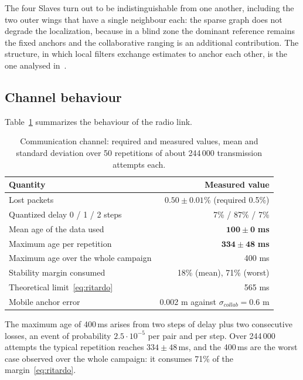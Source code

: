\documentclass[conference,9pt]{IEEEtran}
\begin{document}
The four Slaves turn out to be indistinguishable from one another, including
the two outer wings that have a single neighbour each: the sparse graph does
not degrade the localization, because in a blind zone the dominant reference
remains the fixed anchors and the collaborative ranging is an additional
contribution. The structure, in which local filters exchange estimates to
anchor each other, is the one analysed in~\cite{fontanelli2016}.

\subsection{Channel behaviour}

Table~\ref{tab:canale} summarizes the behaviour of the radio link.

\begin{table}[t]
\centering
\caption{Communication channel: required and measured values, mean and standard
deviation over 50 repetitions of about 244\,000 transmission attempts each.}
\label{tab:canale}
\begin{tabular}{lr}
\toprule
\textbf{Quantity} & \textbf{Measured value}\\
\midrule
Lost packets                           & $0.50 \pm 0.01$\% (required 0.5\%)\\
Quantized delay 0 / 1 / 2 steps        & 7\% / 87\% / 7\%\\
Mean age of the data used              & $\mathbf{100 \pm 0}$ \textbf{ms}\\
Maximum age per repetition             & $\mathbf{334 \pm 48}$ \textbf{ms}\\
Maximum age over the whole campaign    & 400 ms\\
Stability margin consumed              & 18\% (mean), 71\% (worst)\\
Theoretical limit~\eqref{eq:ritardo}   & 565 ms\\
Mobile anchor error                    & 0.002 m against $\sigma_{collab}=0.6$ m\\
\bottomrule
\end{tabular}
\end{table}

The maximum age of 400\,ms arises from two steps of delay plus two consecutive
losses, an event of probability $2.5\cdot10^{-5}$ per pair and per step. Over
244\,000 attempts the typical repetition reaches $334 \pm 48$\,ms, and the
400\,ms are the worst case observed over the whole campaign: it consumes 71\%
of the margin~\eqref{eq:ritardo}.
\end{document}
